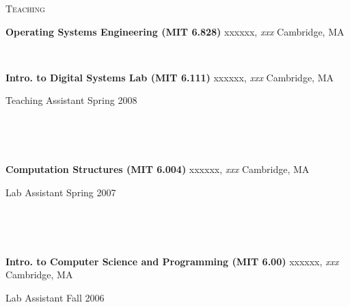 \documentclass[10pt,minionpro]{report}
\newlength{\sectiongap}
\newlength{\entrygap}
\newlength{\sectioncolwidth}
\newlength{\colgap}
\newlength{\stuffwidth}
\def\ifEqString#1#2{\def\testa{#1}\def\testb{#2}%
  \ifx\testa\testb}
\newenvironment{rtable}{
  \begin{minipage}{\textwidth}
  }{
  \end{minipage}
}
\newenvironment{rentry}[3][xxx]{
  \begin{minipage}[t]{\hsize}
    \textbf{#2}\ifEqString{#1}{xxx}\relax\else, \textit{#1}\fi
    \hspace{\stretch{1}} #3 \\
  }{
    \removelastskip
  \end{minipage}
  \\[\entrygap]  %
}
\newcommand{\rline}[2]{
  \begin{minipage}[t]{\hsize}
    #1 \hspace{\stretch{1}} #2
  \end{minipage} \\
}
\newenvironment{rsection}[1]{
  \begin{minipage}[t]{\sectioncolwidth}
    \textsc{#1}
  \end{minipage}
  \hspace{\colgap}
  \begin{minipage}[t]{\stuffwidth}
  }{
    \removelastskip
  \end{minipage}
  \\[\sectiongap]
}
\begin{document}
\begin{rtable}
\begin{rsection}{Teaching}
\begin{rentry}{Operating Systems Engineering (MIT
        6.828)}{Cambridge, MA}
    \end{rentry}
    \begin{rentry}{Intro. to Digital Systems Lab (MIT
        6.111)}{Cambridge, MA}
      \rline{Teaching Assistant}{Spring 2008}
      \vspace{-0.5em}
    \end{rentry}
    \begin{rentry}{Computation Structures (MIT 6.004)}{Cambridge, MA}
      \rline{Lab Assistant}{Spring 2007}
      \vspace{-0.5em}
    \end{rentry}
    \begin{rentry}{Intro. to Computer Science and
        Programming (MIT 6.00)}{Cambridge, MA}
      \rline{Lab Assistant}{Fall 2006}
      \vspace{-1em}
    \end{rentry}
  \end{rsection}


\end{rtable}
\end{document}
